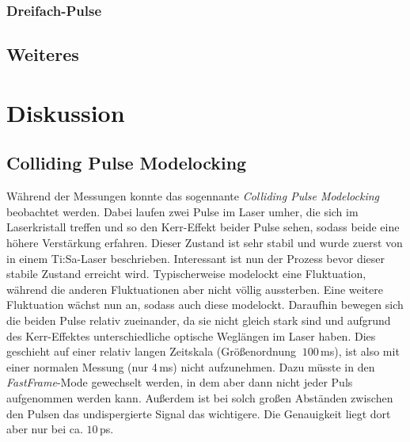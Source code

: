 \documentclass[bachelor,       %
               twoside,        %
               BCOR10mm,       %
               english,ngerman, %
               ]{GAUBM}
\begin{document}
%   

\subsection{Dreifach-Pulse}

\section{Weiteres}

\chapter{Diskussion}
\section{Colliding Pulse Modelocking}
\label{sec:cpml}
Während der Messungen konnte das sogennante \textit{Colliding Pulse Modelocking} beobachtet werden.
Dabei laufen zwei Pulse im Laser umher, die sich im Laserkristall treffen und so den Kerr-Effekt beider Pulse sehen, sodass beide eine höhere Verstärkung erfahren.
Dieser Zustand ist sehr stabil und wurde zuerst von \cite{lai_multiple_1997} in einem Ti:Sa-Laser beschrieben.
Interessant ist nun der Prozess bevor dieser stabile Zustand erreicht wird.
Typischerweise modelockt eine Fluktuation, während die anderen Fluktuationen aber nicht völlig aussterben.
Eine weitere Fluktuation wächst nun an, sodass auch diese modelockt.
Daraufhin bewegen sich die beiden Pulse relativ zueinander, da sie nicht gleich stark sind und aufgrund des Kerr-Effektes unterschiedliche optische Weglängen im Laser haben.
Dies geschieht auf einer relativ langen Zeitskala (Größenordnung $~100\,$ms), ist also mit einer normalen Messung (nur 4\,ms) nicht aufzunehmen.
Dazu müsste in den \textit{FastFrame}-Mode gewechselt werden, in dem aber dann nicht jeder Puls aufgenommen werden kann.
Außerdem ist bei solch großen Abständen zwischen den Pulsen das undispergierte Signal das wichtigere.
Die Genauigkeit liegt dort aber nur bei ca. $10\,$ps.
\end{document}
